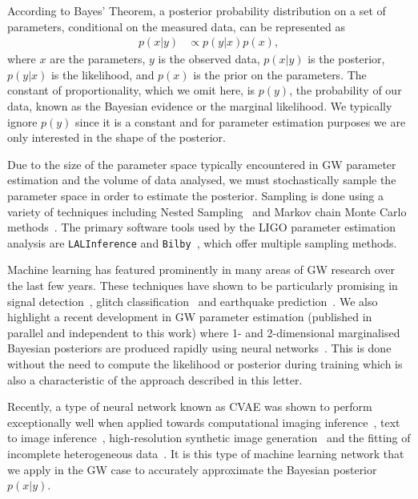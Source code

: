 %
%
According to Bayes' Theorem, a posterior probability distribution on a set of
parameters, conditional on the measured data, can be represented as
%
\begin{align}\label{eq:bayes_theorem} 
p(x|y) &\propto p(y|x) p(x), 
\end{align}
%
where $x$ are the parameters, $y$ is the observed data, $p(x|y)$ is the
posterior, $p(y|x)$ is the likelihood, and $p(x)$ is the prior on the
parameters. The constant of proportionality, which we omit here, is
$p(y)$, the probability of our data, known as the Bayesian evidence or the
marginal likelihood. We typically ignore $p(y)$ since it is a constant and for
parameter estimation purposes we are only interested in the shape of the
posterior.

%
%
Due to the size of the parameter space typically encountered in \ac{GW}
parameter estimation and the volume of data analysed, we must stochastically
sample the parameter space in order to estimate the posterior.  Sampling is
done using a variety of techniques including Nested
Sampling~\cite{skilling2006,cpnest,dynesty} and Markov chain Monte Carlo
methods~\cite{emcee,ptemcee}. The primary software tools used by the \ac{LIGO}
parameter estimation analysis are \texttt{LALInference} and
\texttt{Bilby}~\cite{1409.7215,1811.02042}, which offer multiple sampling
methods.  
  
%
%
Machine learning has featured prominently in many areas of \ac{GW} research
over the last few years. These techniques have shown to be particularly
promising in signal
detection~\cite{GEORGE201864,PhysRevLett.120.141103,GebKilParHarSch}, glitch
classification~\cite{0264-9381-34-6-064003} and earthquake
prediction~\cite{Coughlin_2017}. We also highlight a recent development in
\ac{GW} parameter estimation (published in parallel and independent to this
work) where 1- and 2-dimensional marginalised Bayesian posteriors are produced
rapidly using neural networks~\cite{2019arXiv190905966C}. This is done without
the need to compute the likelihood or posterior during training which is also a
characteristic of the approach described in this letter.

%
%
Recently, a type of neural network known as \ac{CVAE} was
shown to perform exceptionally well when applied towards computational imaging
inference~\cite{1904.06264,NIPS2015_5775}, text to image
inference~\cite{1512.00570}, high-resolution synthetic image
generation~\cite{1612.00005} and the fitting of incomplete heterogeneous
data~\cite{1807.03653}. It is this type of machine learning network that we
apply in the \ac{GW} case to accurately approximate the Bayesian posterior
$p(x|y)$. 

